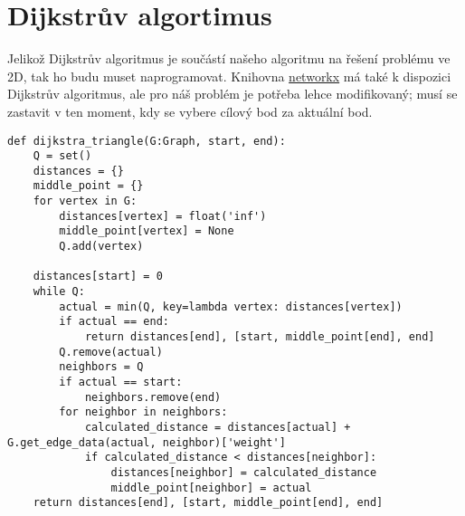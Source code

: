\section{Dijkstrův algortimus}
\label{sec:dijkstra_program}

Jelikož Dijkstrův algoritmus je součástí našeho algoritmu na řešení problému ve 2D, tak ho budu muset naprogramovat. Knihovna \href{https://networkx.org/}{networkx} má také k dispozici Dijkstrův algoritmus, ale pro náš problém je potřeba lehce modifikovaný; musí se zastavit v ten moment, kdy se vybere cílový bod za aktuální bod. 

\begin{lstlisting}[style=me]
def dijkstra_triangle(G:Graph, start, end):
    Q = set()
    distances = {} 
    middle_point = {} 
    for vertex in G:
        distances[vertex] = float('inf')
        middle_point[vertex] = None
        Q.add(vertex)

    distances[start] = 0
    while Q: 
        actual = min(Q, key=lambda vertex: distances[vertex])
        if actual == end:
            return distances[end], [start, middle_point[end], end]
        Q.remove(actual)
        neighbors = Q
        if actual == start:
            neighbors.remove(end)
        for neighbor in neighbors:
            calculated_distance = distances[actual] + G.get_edge_data(actual, neighbor)['weight']
            if calculated_distance < distances[neighbor]:
                distances[neighbor] = calculated_distance
                middle_point[neighbor] = actual
    return distances[end], [start, middle_point[end], end]
\end{lstlisting}